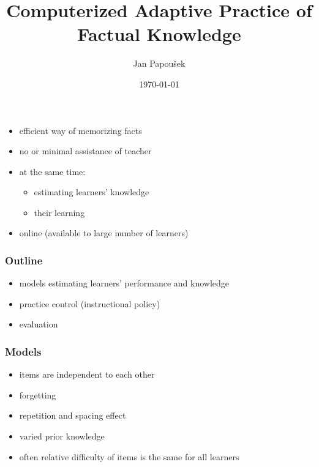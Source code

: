 \documentclass[xcolor=svgnames]{beamer}
\title{Computerized Adaptive Practice of Factual Knowledge}
\author{Jan Papou\v{s}ek}
\institute{Masaryk University Brno}
\date{\today}
\begin{document}
\frame[plain]{\titlepage}
\begin{frame}
	\begin{itemize}
		\item efficient way of memorizing facts
		\item no or minimal assistance of teacher
		\item at the same time:
			\begin{itemize}
				\item estimating learners' knowledge
				\item their learning
			\end{itemize}
		\item online (available to large number of learners)
	\end{itemize}
\end{frame}
\begin{frame}
	\frametitle{Outline}
	\begin{itemize}
		\item models estimating learners' performance and knowledge
		\item practice control (instructional policy)
		\item evaluation
	\end{itemize}
\end{frame}
\begin{frame}
	\frametitle{Models}
	\begin{itemize}
		\item items are independent to each other
		\item forgetting
		\item repetition and spacing effect
		\item varied prior knowledge
		\item often relative difficulty of items is the same for all learners
	\end{itemize}
\end{frame}
\end{document}
